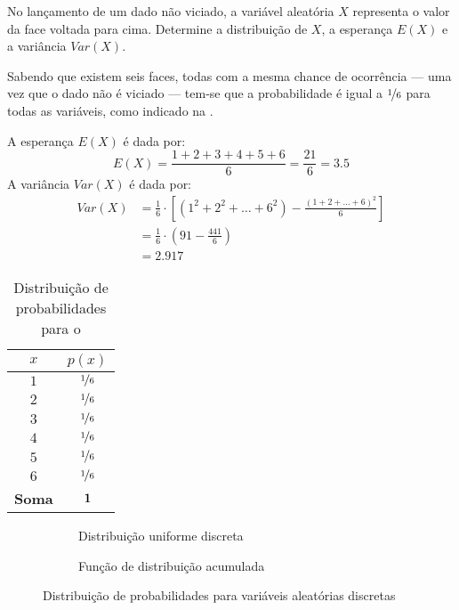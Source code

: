 \begin{eg}
No lançamento de um dado não viciado, a variável aleatória $X$ representa o
valor da face voltada para cima. Determine a distribuição de $X$, a
esperança $E(X)$ e a variância $Var(X)$.
\label{eg:dado-dist-aleatoria}
\end{eg}

\begin{sol}
Sabendo que existem seis faces, todas com a mesma chance de ocorrência --- uma
vez que o dado não é viciado --- tem-se que a probabilidade é igual a
$\nicefrac{1}{6}$ para todas as variáveis, como indicado na
.

A esperança $E(X)$ é dada por:
 \[
E(X) = \frac{1+2+3+4+5+6}{6} = \frac{21}{6} = 3.5
\]
A variância $Var(X)$ é dada por:
\begin{align*}
Var(X) &= \frac{1}{6} \cdot \left[
    (1^2 + 2^2 + \ldots + 6^2) - \frac{\left(1 + 2 + \ldots + 6\right)^2}{6}
\right] \\
       &= \frac{1}{6} \cdot \left(91 - \frac{441}{6}\right) \\
       &= 2.917
\end{align*}
\end{sol}

\begin{table}
    \centering
    \begin{tabular}{cc}
        \toprule
        $x$ & $p(x)$ \\
        \midrule
        $1$ & $\nicefrac{1}{6}$ \\
        $2$ & $\nicefrac{1}{6}$ \\
        $3$ & $\nicefrac{1}{6}$ \\
        $4$ & $\nicefrac{1}{6}$ \\
        $5$ & $\nicefrac{1}{6}$ \\
        $6$ & $\nicefrac{1}{6}$ \\
        \midrule
        \textbf{Soma} & $\mathbf{1}$ \\
        \bottomrule
    \end{tabular}
    \caption{Distribuição de probabilidades para o }
    \label{tab:dado-dist-aleatoria}
\end{table}

\begin{figure}[ht!]
    \centering
    \begin{subfigure}{0.48\textwidth}
        \centering
        
        \caption{Distribuição uniforme discreta}
        \label{fig:dist-uniforme-discreta}
    \end{subfigure}
    \hfill
    \begin{subfigure}{0.48\textwidth}
        \centering
        
        \caption{Função de distribuição acumulada}
        \label{fig:dist-uniforme-discreta-acumulada}
    \end{subfigure}
    \caption{Distribuição de probabilidades para variáveis aleatórias discretas}
    \label{fig:dist-uniforme-discreta-grupo}
\end{figure}

